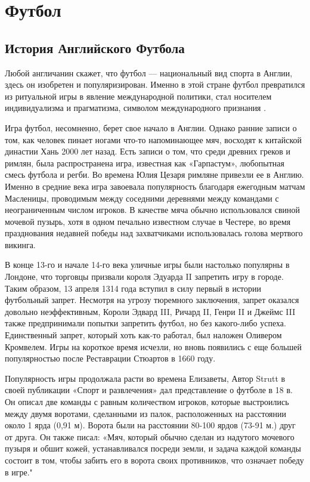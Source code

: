 \section{Футбол}
\subsection{История Английского Футбола}

Любой англичанин скажет, что футбол --- национальный вид спорта в Англии, здесь он изобретен и популяризирован. Именно в этой стране футбол превратился из ритуальной игры в явление международной политики, стал носителем индивидуализма и прагматизма, символом международного признания \cite{football}.

Игра футбол, несомненно, берет свое начало в Англии. Однако ранние записи о том, как человек пинает ногами что-то напоминающее мяч, восходят к китайской династии Хань 2000 лет назад. Есть записи о том, что среди древних греков и римлян, была распространена игра, известная как «Гарпастум», любопытная смесь футбола и регби. Во времена Юлия Цезаря римляне привезли ее в Англию. Именно в средние века игра завоевала популярность благодаря ежегодным матчам Масленицы, проводимым между соседними деревнями между командами с неограниченным числом игроков. В качестве мяча обычно использовался свиной мочевой пузырь, хотя в одном печально известном случае в Честере, во время празднования недавней победы над захватчиками использовалась голова мертвого викинга.

В конце 13-го и начале 14-го века уличные игры были настолько популярны в Лондоне, что торговцы призвали короля Эдуарда II запретить игру в городе.  Таким образом, 13 апреля 1314 года вступил в силу первый в истории футбольный запрет. Несмотря на угрозу тюремного заключения, запрет оказался довольно неэффективным, Короли Эдвард III, Ричард II, Генри II и Джеймс III также предпринимали попытки запретить футбол, но без какого-либо успеха. Единственный запрет, который хоть как-то работал, был наложен Оливером Кромвелем. Игры на короткое время исчезли, но вновь появились с еще большей популярностью после Реставрации Стюартов в 1660 году.

Популярность игры продолжала расти во времена Елизаветы, Автор Strutt в своей публикации «Спорт и развлечения» дал представление о футболе в 18 в. Он описал две команды с равным количеством игроков, которые выстроились между двумя воротами, сделанными из палок, расположенных на расстоянии около 1 ярда (0,91 м). Ворота были на расстоянии 80-100 ярдов (73-91 м.) друг от друга. Он также писал: «Мяч, который обычно сделан из надутого мочевого пузыря и обшит кожей, устанавливался посреди земли, и задача каждой команды состоит в том, чтобы забить его в ворота своих противников, что означает победу в игре."

